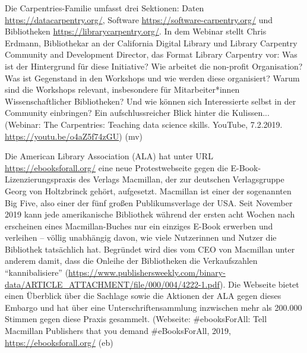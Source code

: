 \documentclass[a4paper,
fontsize=11pt,
oneside,
numbers=noperiodatend,
parskip=half-,
bibliography=totoc,
final
]{scrartcl}
\begin{document}
Die Carpentries-Familie umfasst drei Sektionen: Daten
\url{https://datacarpentry.org/}, Software
\url{https://software-carpentry.org/} und Bibliotheken
\url{https://librarycarpentry.org/}. In dem Webinar stellt Chris
Erdmann, Bibliothekar an der California Digital Library und Library
Carpentry Community and Development Director, das Format Library
Carpentry vor: Was ist der Hintergrund für diese Initiative? Wie
arbeitet die non-profit Organisation? Was ist Gegenstand in den
Workshops und wie werden diese organisiert? Warum sind die Workshops
relevant, insbesondere für Mitarbeiter*innen Wissenschaftlicher
Bibliotheken? Und wie können sich Interessierte selbst in der Community
einbringen? Ein aufschlussreicher Blick hinter die Kulissen... (Webinar:
The Carpentries: Teaching data science skills. YouTube, 7.2.2019.
\url{https://youtu.be/o4aZ5f74zGU}) (mv)

Die American Library Association (ALA) hat unter URL
\url{https://ebooksforall.org/} eine neue Protestwebseite gegen die
E-Book-Lizenzierungspraxis des Verlags Macmillan, der zur deutschen
Verlagsgruppe Georg von Holtzbrinck gehört, aufgesetzt. Macmillan ist
einer der sogenannten Big Five, also einer der fünf großen
Publikumsverlage der USA. Seit November 2019 kann jede amerikanische
Bibliothek während der ersten acht Wochen nach erscheinen eines
Macmillan-Buches nur ein einziges E-Book erwerben und verleihen --
völlig unabhängig davon, wie viele Nutzerinnen und Nutzer die Bibliothek
tatsächlich hat. Begründet wird dies vom CEO von Macmillan unter anderem
damit, dass die Onleihe der Bibliotheken die Verkaufszahlen
\enquote{kannibalisiere}
(\url{https://www.publishersweekly.com/binary-data/ARTICLE_ATTACHMENT/file/000/004/4222-1.pdf}).
Die Webseite bietet einen Überblick über die Sachlage sowie die Aktionen
der ALA gegen dieses Embargo und hat über eine Unterschriftensammlung
inzwischen mehr als 200.000 Stimmen gegen diese Praxis gesammelt.
(Webseite: \#ebooksForAll: Tell Macmillan Publishers that you demand
\#eBooksForAll, 2019, \url{https://ebooksforall.org/} (eb)

\end{document}
